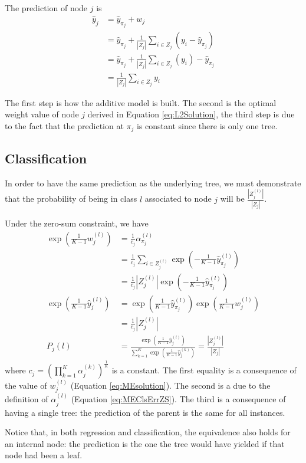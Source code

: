 \documentclass{article}
\begin{document}
The prediction of node $j$ is
\begin{align}\label{eq:EquivL2Solution}
\hat{y}_j &= \hat{y}_{\pi_j} + w_j \\
&= \hat{y}_{\pi_j} +  \frac{1}{|Z_j|} \sum_{i \in Z_j} \left(y_i - 
\hat{y}_{\pi_j}\right) \\
&= \hat{y}_{\pi_j} + \frac{1}{|Z_j|} \sum_{i \in Z_j} \left( y_i \right) - 
\hat{y}_{\pi_j} \\
&= \frac{1}{|Z_j|} \sum_{i \in Z_j}  y_i 
\end{align}


The first step is how the additive model is built. The second is the optimal 
weight value of node $j$ derived in Equation \ref{eq:L2Solution}, the third 
step is due to the fact that the prediction at $\pi_j$ is constant since there 
is only one tree.

\subsection{Classification}
In order to have the same prediction as the underlying tree, we must 
demonstrate that the probability of being in class $l$ associated to node $j$ 
will be $\frac{|Z_j^{(l)}|}{|Z_j|}$.

Under the zero-sum constraint, we have
\begin{align} 
\exp \left(  \frac{1}{K-1} w_j^{(l)}\right) &= \frac{1}{c_j} 
\alpha_{\pi_j}^{(l)} \\
&=  \frac{1}{c_j} \sum_{i \in Z_j^{(l)}} \exp \left(-\frac{1}{K-1} 
\hat{y}_{\pi_j}^{(l)}\right)\\
&= \frac{1}{c_j} |Z_j^{(l)}| \exp \left(-\frac{1}{K-1} 
\hat{y}_{\pi_j}^{(l)}\right) \\
\exp \left(\frac{1}{K-1} \hat{y}_j^{(l)} \right) &= \exp \left(\frac{1}{K-1} 
\hat{y}_{\pi_j}^{(l)} \right) \exp \left(\frac{1}{K-1} w_j^{(l)}\right) \\
&= \frac{1}{c_j} |Z_j^{(l)}| \\
P_j(l) &= \frac{\exp \left(\frac{1}{K-1} \hat{y}_j^{(l)}
\right)}{\sum_{k=1}^K\exp \left(\frac{1}{K-1} \hat{y}_j^{(k)} \right)} = 
\frac{|Z_j^{(l)}|}{|Z_j|}
\end{align}	
where $c_j = \left(\prod_{k=1}^K \alpha_j^{(k)}\right)^{\frac{1}{K}}$ is a 
constant. The first equality is a consequence of the value of $w_j^{(l)}$ 
(Equation \ref{eq:MEsolution}). The second is a due to the definition of 
$\alpha_j^{(l)}$ (Equation \ref{eq:MEClsErrZS}). The third is a consequence of 
having a single tree: the prediction of the parent is the same for all 
instances.




Notice that, in both regression and classification, the equivalence also holds 
for an internal node: the prediction is the one the tree would have yielded if 
that node had been a leaf.



\end{document}
